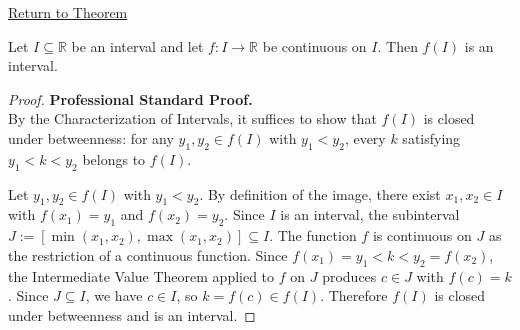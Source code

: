 \newpage
{}
\label{prf:preservation-of-intervals}

\begin{remark*}[Return]
\hyperref[thm:preservation-of-intervals]{Return to Theorem}
\end{remark*}

\begin{theorem*}
Let $I \subseteq \mathbb{R}$ be an interval and let $f : I \to \mathbb{R}$ be continuous on $I$. Then $f(I)$ is an interval.
\end{theorem*}

\begin{proof}
\textbf{Professional Standard Proof.}~\\
By the Characterization of Intervals, it suffices to show that $f(I)$ is closed under betweenness: for any $y_1, y_2 \in f(I)$ with $y_1 < y_2$, every $k$ satisfying $y_1 < k < y_2$ belongs to $f(I)$.

Let $y_1, y_2 \in f(I)$ with $y_1 < y_2$. By definition of the image, there exist $x_1, x_2 \in I$ with $f(x_1) = y_1$ and $f(x_2) = y_2$. Since $I$ is an interval, the subinterval $J := [\min(x_1, x_2), \max(x_1, x_2)] \subseteq I$. The function $f$ is continuous on $J$ as the restriction of a continuous function. Since $f(x_1) = y_1 < k < y_2 = f(x_2)$, the Intermediate Value Theorem applied to $f$ on $J$ produces $c \in J$ with $f(c) = k$. Since $J \subseteq I$, we have $c \in I$, so $k = f(c) \in f(I)$. Therefore $f(I)$ is closed under betweenness and is an interval.
\end{proof}

